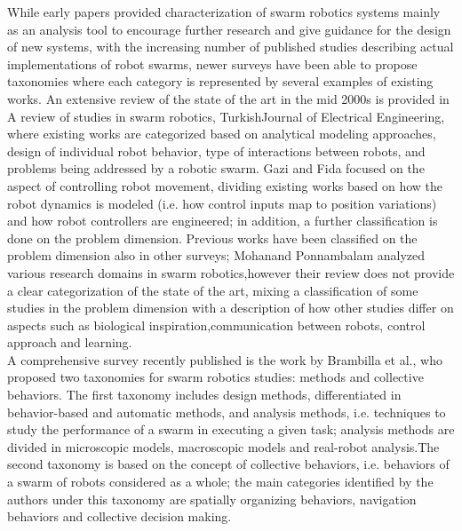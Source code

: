 While early papers provided characterization of swarm robotics systems mainly as an analysis tool to encourage further research and give guidance for the design of new systems, with the increasing number of published studies describing actual implementations of robot swarms, newer surveys have been able to propose taxonomies where each category is represented by several examples of existing works. An extensive review of the state of the art in the mid 2000s is provided in A review of studies in swarm robotics, TurkishJournal of Electrical Engineering\cite{seventh}, where existing works are categorized based on analytical modeling approaches, design of individual robot behavior, type of interactions between robots, and problems being addressed by a robotic swarm. Gazi and Fida\cite{eighth} focused on the aspect of controlling robot movement, dividing existing works based on how the robot dynamics is modeled (i.e. how control inputs map to position variations) and how robot controllers are engineered; in addition, a further classification is done on the problem dimension. Previous works have been classified on the problem dimension also in other surveys; Mohanand Ponnambalam\cite{eleven} analyzed various research domains in swarm robotics,however their review does not provide a clear categorization of the state of the art, mixing a classification of some studies in the problem dimension with a description of how other studies differ on aspects such as biological inspiration,communication between robots, control approach and learning.\\
A comprehensive survey recently published is the work by Brambilla et al.\cite{twelve}, who proposed two taxonomies for swarm robotics studies: methods and collective behaviors. The first taxonomy includes design methods, differentiated in behavior-based and automatic methods, and analysis methods, i.e. techniques to study the performance of a swarm in executing a given task; analysis methods are divided in microscopic models, macroscopic models and real-robot analysis.The second taxonomy is based on the concept of collective behaviors, i.e. behaviors of a swarm of robots considered as a whole; the main categories identified by the authors under this taxonomy are spatially organizing behaviors, navigation behaviors and collective decision making.\\
